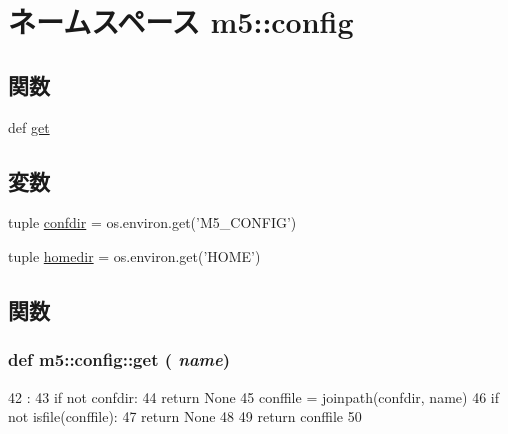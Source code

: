 \hypertarget{namespacem5_1_1config}{
\section{ネームスペース m5::config}
\label{namespacem5_1_1config}
}
\subsection*{関数}
\begin{DoxyCompactItemize}
\item 
def \hyperlink{namespacem5_1_1config_a0931beb6578bbabc087ef32d24191e4c}{get}
\end{DoxyCompactItemize}
\subsection*{変数}
\begin{DoxyCompactItemize}
\item 
tuple \hyperlink{namespacem5_1_1config_a15fead5ae2852fe545b5fd29acacdf18}{confdir} = os.environ.get('M5\_\-CONFIG')
\item 
tuple \hyperlink{namespacem5_1_1config_a693a958b11073f99532d303cd5f1ab62}{homedir} = os.environ.get('HOME')
\end{DoxyCompactItemize}


\subsection{関数}
\hypertarget{namespacem5_1_1config_a0931beb6578bbabc087ef32d24191e4c}{
\subsubsection[{get}]{\setlength{\rightskip}{0pt plus 5cm}def m5::config::get ( {\em name})}}
\label{namespacem5_1_1config_a0931beb6578bbabc087ef32d24191e4c}



\begin{DoxyCode}
42              :
43     if not confdir:
44         return None
45     conffile = joinpath(confdir, name)
46     if not isfile(conffile):
47         return None
48 
49     return conffile
50 

\end{DoxyCode}


